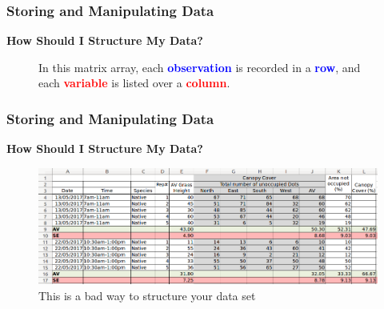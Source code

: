 \documentclass{beamer}
\begin{document}
\begin{frame}
\frametitle{Storing and Manipulating Data}
\textbf{How Should I Structure My Data?}
\vspace{0.5cm}
\begin{figure}
\caption{In this matrix array, each \textbf{\textcolor{blue}{observation}} is recorded in a \textbf{\textcolor{blue}{row}}, and each \textbf{\textcolor{red}{variable}} is listed over a \textbf{\textcolor{red}{column}}.}
\end{figure}
\end{frame}


\begin{frame}
\frametitle{Storing and Manipulating Data}
\textbf{How Should I Structure My Data?}\\
\vspace{0.5cm}
\begin{figure}
\includegraphics[scale=0.33]{bad_structure}
\caption{This is a bad way to structure your data set}
\end{figure}
\end{frame}
\end{document}
